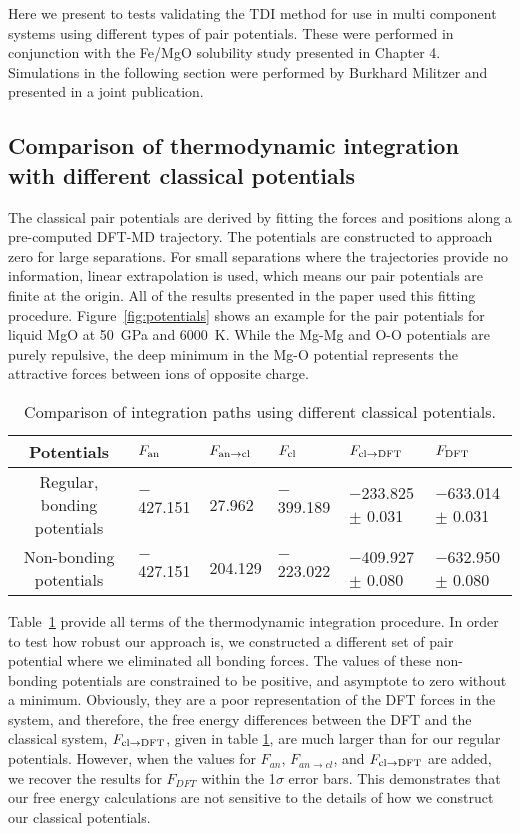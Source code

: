 Here we present to tests validating the TDI method for use in multi component systems
using different types of pair potentials. These were performed in conjunction with
the Fe/MgO solubility study presented in Chapter 4. Simulations in the following section were
performed by Burkhard Militzer and presented in a joint publication.

\subsection{Comparison of thermodynamic integration with different classical potentials}

The classical pair potentials are derived by fitting the forces and
positions along a pre-computed DFT-MD trajectory. The potentials are
constructed to approach zero for large separations. For small separations
where the trajectories provide no information, linear extrapolation is
used, which means our pair potentials are finite at the origin. All of the
results presented in the paper used this fitting procedure.
Figure~\ref{fig:potentials} shows an example for the pair potentials for
liquid MgO at 50~GPa and 6000~K.  While the Mg-Mg and O-O potentials are
purely repulsive, the deep minimum in the Mg-O potential represents the
attractive forces between ions of opposite charge.

\begin{table}[!h]
    \centering
\caption{Comparison of integration paths using different classical potentials.\label{tab:compare_pots}}
\begin{adjustbox}{max width=\textwidth}
\begin{tabular}{clllll}
\hline
Potentials & $F_{\rm an}$ & $F_{\rm an \to cl}$ & $F_{\rm cl}$ & $F_{\rm cl \to DFT}$ & $F_{\rm DFT}$ \\
\hline
Regular, bonding potentials & $-$427.151 & 27.962 & $-$399.189 & $-$233.825 $\pm$ 0.031 & $-$633.014  $\pm$ 0.031 \\
Non-bonding potentials & $-$427.151 & 204.129 & $-$223.022 & $-$409.927 $\pm$ 0.080 & $-$632.950 $\pm$ 0.080 \\
\hline
\end{tabular}
\end{adjustbox}
\end{table}

Table~\ref{tab:compare_pots} provide all terms of the thermodynamic integration
procedure. In order to test how robust our approach is, we constructed a different
set of pair potential where we eliminated all bonding forces. The values of these
non-bonding potentials are constrained to be positive, and asymptote to zero without
a minimum. Obviously, they are a poor representation of the DFT forces in the
system,
and therefore, the free energy differences between the DFT and the classical system,
$F_{\rm cl \to DFT}$, given in table \ref{tab:compare_pots}, are much larger than for
our regular potentials.  However, when the values for $F_{an}$, $F_{an \to cl}$, and
$F_{\rm cl \to DFT}$ are added, we recover the results for $F_{DFT}$ within the
1$\sigma$ error bars. This demonstrates that our free energy calculations are not
sensitive to the details of how we construct our classical potentials.

